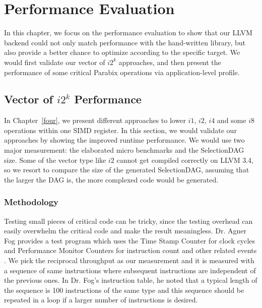 %
%

\chapter{Performance Evaluation}
\label{six}

In this chapter, we focus on the performance evaluation to show that our LLVM backend could not only match performance with the hand-written library, but also provide a better chance to optimize according to the specific target. We would first validate our vector of $i2^k$ approaches, and then present the performance of some critical Parabix operations via application-level profile.

\section{Vector of $i2^k$ Performance}
In Chapter~\ref{four}, we present different approaches to lower $i1$, $i2$, $i4$ and some $i8$ operations within one SIMD register. In this section, we would validate our approaches by showing the improved runtime performance. We would use two major measurement: the elaborated micro benchmarks and the SelectionDAG size. Some of the vector type like $i2$ cannot get compiled correctly on LLVM 3.4, so we resort to compare the size of the generated SelectionDAG, assuming that the larger the DAG is, the more complexed code would be generated.

\subsection{Methodology}

Testing small pieces of critical code can be tricky, since the testing overhead can easily overwhelm the critical code and make the result meaningless. Dr. Agner Fog provides a test program which uses the Time Stamp Counter for clock cycles and Performance Monitor Counters for instruction count and other related events \cite{agner_testp}. We pick the reciprocal throughput as our measurement and it is measured with a sequence of same instructions where subsequent instructions are independent of the previous ones. In Dr. Fog's instruction table, he noted that a typical length of the sequence is 100 instructions of the same type and this sequence should be repeated in a loop if a larger number of instructions is desired.

